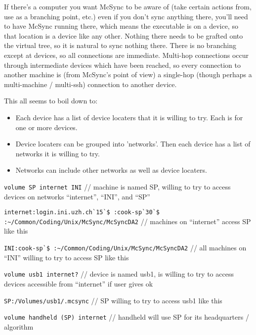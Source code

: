 \documentclass{book}
\begin{document}
If there's a computer you want McSync to be aware of (take certain actions from, use as a branching point, etc.) even if you don't sync anything there, you'll need to have McSync running there, which means the executable is on a device, so that location is a device like any other.  Nothing there needs to be grafted onto the virtual tree, so it is natural to sync nothing there.  There is no branching except at devices, so all connections are immediate.  Multi-hop connections occur through intermediate devices which have been reached, so every connection to another machine is (from McSync's point of view) a single-hop (though perhaps a multi-machine / multi-ssh) connection to another device.

This all seems to boil down to:
\begin{itemize}
\item Each device has a list of device locaters that it is willing to try.  Each is for one or more devices.
\item Device locaters can be grouped into 'networks'.  Then each device has a list of networks it is willing to try.
\item Networks can include other networks as well as device locaters.
\end{itemize}

\verb+volume SP internet INI+
\newline// machine is named SP, willing to try to access devices on networks ``internet'', ``INI'', and ``SP''

\verb+internet:login.ini.uzh.ch`15`$ :cook-sp`30`$ :~/Common/Coding/Unix/McSync/McSyncDA2+
\newline// machines on ``internet'' access SP like this

\verb+INI:cook-sp`$ :~/Common/Coding/Unix/McSync/McSyncDA2+
\newline// all machines on ``INI'' willing to try to access SP like this

\verb+volume usb1 internet?+
\newline// device is named usb1, is willing to try to access devices accessible from ``internet'' if user gives ok

\verb+SP:/Volumes/usb1/.mcsync+
\newline// SP willing to try to access usb1 like this

\verb+volume handheld (SP) internet+
\newline// handheld will use SP for its headquarters / algorithm

~
\end{document}
